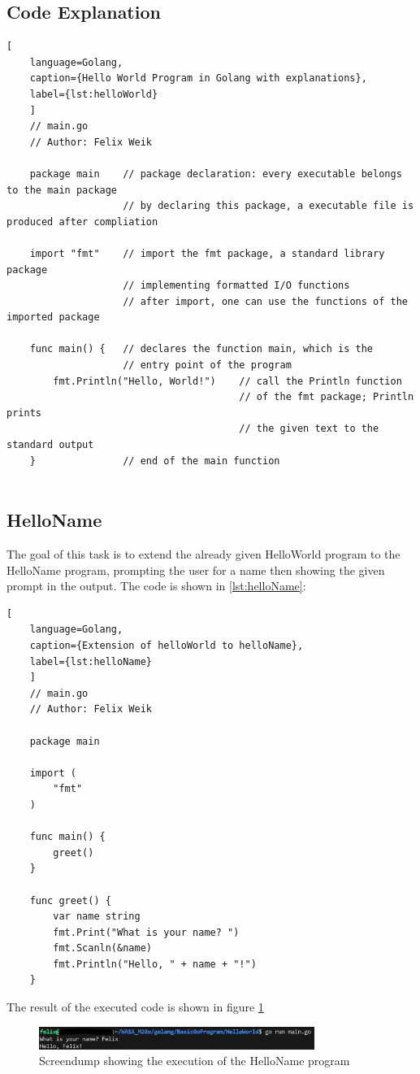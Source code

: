 \subsection{Code Explanation}
\begin{lstlisting}[
    language=Golang,
    caption={Hello World Program in Golang with explanations},
    label={lst:helloWorld}
    ]
    // main.go 
    // Author: Felix Weik

    package main    // package declaration: every executable belongs to the main package
                    // by declaring this package, a executable file is produced after compliation
    
    import "fmt"    // import the fmt package, a standard library package 
                    // implementing formatted I/O functions
                    // after import, one can use the functions of the imported package

    func main() {   // declares the function main, which is the 
                    // entry point of the program
        fmt.Println("Hello, World!")    // call the Println function 
                                        // of the fmt package; Println prints 
                                        // the given text to the standard output
    }               // end of the main function
    
\end{lstlisting}

\subsection{HelloName}
The goal of this task is to extend the already given HelloWorld program to the HelloName program, prompting the user for a name then showing the given prompt in the output.
The code is shown in \ref{lst:helloName}:
\begin{lstlisting}[
    language=Golang,
    caption={Extension of helloWorld to helloName},
    label={lst:helloName}
    ]
    // main.go
    // Author: Felix Weik

    package main

    import (
        "fmt"
    )

    func main() {
        greet()
    }

    func greet() {
        var name string
        fmt.Print("What is your name? ")
        fmt.Scanln(&name)
        fmt.Println("Hello, " + name + "!")
    } 
\end{lstlisting}

The result of the executed code is shown in figure \ref{fig:screendump_helloName}

\begin{figure}
    \centering
    \includegraphics[width=0.8\textwidth]{figures/goLang/helloWorld/golang_helloWorld_helloName.png}
    \caption{Screendump showing the execution of the HelloName program}
    \label{fig:screendump_helloName}
\end{figure}